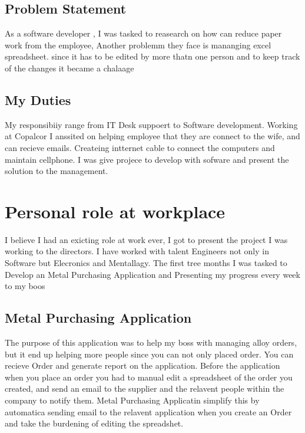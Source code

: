 \documentclass[paper=a4, fontsize=12pt]{scrartcl}
\numberwithin{equation}{section}		%
\numberwithin{figure}{section}			%
\numberwithin{table}{section}				%
\begin{document}
\subsection{Problem Statement}
As a software developer , I was tasked to reasearch on how can reduce paper work from
the employee, Another problemm they face is mananging excel spreadsheet. since it has to be 
edited by more thatn one person and to keep track of the changes it became a chalaage

\subsection{My Duties}
My responsibiiy range from IT Desk suppoert to Software development. Working at
Copalcor I anssited on helping employee that they are connect to the wife, and 
can recieve emails. Createing intternet cable to connect the computers and 
maintain cellphone. I was give projece to develop with sofware and present the
solution to the management.

\section{\textbf{Personal role at workplace} }
I believe I had an exicting role at work ever, I got to present the project I was
working to the directors. I have worked with talent Engineers
not only in Software but Elecronics and Mentallagy. The first tree months I 
was tasked to Develop an Metal Purchasing Application and Presenting my progress
every week to my boos

\subsection{Metal Purchasing Application}
The purpose of this application was to help my boss with managing alloy orders, but
it end up helping more people since you can not only placed order. You can 
recieve Order and generate report on the application. Before the application
when you place an order you had to manual edit a spreadsheet of the order 
you created, and send an email to the supplier and the relavent people within
the company to notify them. Metal Purchasing Applicatin simplify this by 
automatica sending email to the relavent application when you create an Order and
take the burdening of editing the spreadshet.
\end{document}
